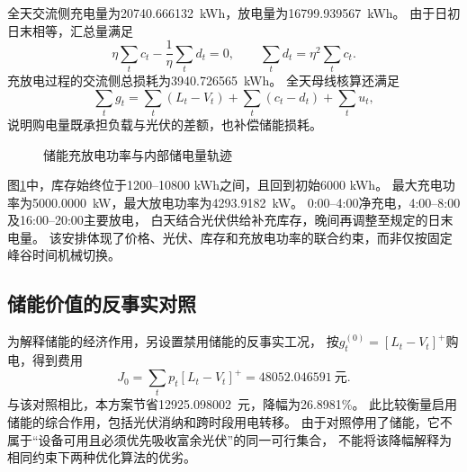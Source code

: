 \documentclass[UTF8,a4paper,12pt,fontset=fandol]{ctexart}
\newcommand{\pos}[1]{\left[#1\right]^+}
\newcommand{\ChargeTotal}{20740.666132}
\newcommand{\DischargeTotal}{16799.939567}
\newcommand{\LossTotal}{3940.726565}
\newcommand{\NoStorageCost}{48052.046591}
\newcommand{\Saving}{12925.098002}
\newcommand{\SavingPercent}{26.8981}
\begin{document}
全天交流侧充电量为\ChargeTotal\ kWh，放电量为\DischargeTotal\ kWh。
由于日初日末相等，汇总量满足
\begin{equation}
  \eta\sum_t c_t-\frac{1}{\eta}\sum_t d_t=0,\qquad
  \sum_t d_t=\eta^2\sum_t c_t.
  \label{eq:totalstate}
\end{equation}
充放电过程的交流侧总损耗为\LossTotal\ kWh。
全天母线核算还满足
\begin{equation}
  \sum_tg_t=\sum_t(L_t-V_t)+\sum_t(c_t-d_t)+\sum_tu_t,
  \label{eq:totalbalance}
\end{equation}
说明购电量既承担负载与光伏的差额，也补偿储能损耗。

\begin{figure}[htbp]
  \centering
  \caption{储能充放电功率与内部储电量轨迹}\label{fig:storage}
\end{figure}

图\ref{fig:storage}中，库存始终位于1200--10800 kWh之间，且回到初始6000 kWh。
最大充电功率为5000.0000\ kW，最大放电功率为4293.9182\ kW。
0:00--4:00净充电，4:00--8:00及16:00--20:00主要放电，
白天结合光伏供给补充库存，晚间再调整至规定的日末电量。
该安排体现了价格、光伏、库存和充放电功率的联合约束，而非仅按固定峰谷时间机械切换。

\subsection{储能价值的反事实对照}
为解释储能的经济作用，另设置禁用储能的反事实工况，
按$g_t^{(0)}=\pos{L_t-V_t}$购电，得到费用
\begin{equation}
  J_0=\sum_t p_t\pos{L_t-V_t}=\NoStorageCost\ \text{元}.
  \label{eq:baseline}
\end{equation}
与该对照相比，本方案节省\Saving\ 元，降幅为\SavingPercent\%。
此比较衡量启用储能的综合作用，包括光伏消纳和跨时段用电转移。
由于对照停用了储能，它不属于“设备可用且必须优先吸收富余光伏”的同一可行集合，
不能将该降幅解释为相同约束下两种优化算法的优劣。
\end{document}
